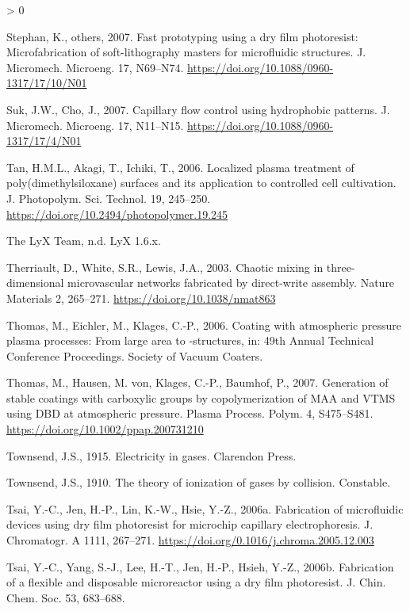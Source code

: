 \documentclass[
  11pt,
  twoside]{article}
\newlength{\cslhangindent}
\newenvironment{CSLReferences}[2] %
 {%
  \setlength{\parindent}{0pt}
  \ifodd #1 \everypar{\setlength{\hangindent}{\cslhangindent}}\ignorespaces\fi
  \ifnum #2 > 0
  \setlength{\parskip}{#2\baselineskip}
  \fi
 }%
 {}
\begin{document}
\begin{CSLReferences}{1}{0}
\leavevmode\hypertarget{ref-Step07}{}%
Stephan, K., others, 2007. Fast prototyping using a dry film photoresist: Microfabrication of soft-lithography masters for microfluidic structures. J. Micromech. Microeng. 17, N69--N74. \url{https://doi.org/10.1088/0960-1317/17/10/N01}

\leavevmode\hypertarget{ref-Suk07}{}%
Suk, J.W., Cho, J., 2007. Capillary flow control using hydrophobic patterns. J. Micromech. Microeng. 17, N11--N15. \url{https://doi.org/10.1088/0960-1317/17/4/N01}

\leavevmode\hypertarget{ref-Tan06}{}%
Tan, H.M.L., Akagi, T., Ichiki, T., 2006. Localized plasma treatment of poly(dimethylsiloxane) surfaces and its application to controlled cell cultivation. J. Photopolym. Sci. Technol. 19, 245--250. \url{https://doi.org/10.2494/photopolymer.19.245}

\leavevmode\hypertarget{ref-LyX}{}%
The LyX Team, n.d. LyX 1.6.x.

\leavevmode\hypertarget{ref-Ther03}{}%
Therriault, D., White, S.R., Lewis, J.A., 2003. Chaotic mixing in three-dimensional microvascular networks fabricated by direct-write assembly. Nature Materials 2, 265--271. \url{https://doi.org/10.1038/nmat863}

\leavevmode\hypertarget{ref-Thom06}{}%
Thomas, M., Eichler, M., Klages, C.-P., 2006. Coating with atmospheric pressure plasma processes: From large area to {}-structures, in: 49th Annual Technical Conference Proceedings. Society of Vacuum Coaters.

\leavevmode\hypertarget{ref-Thom07}{}%
Thomas, M., Hausen, M. von, Klages, C.-P., Baumhof, P., 2007. Generation of stable coatings with carboxylic groups by copolymerization of {MAA} and {VTMS} using {DBD} at atmospheric pressure. Plasma Process. Polym. 4, S475--S481. \url{https://doi.org/10.1002/ppap.200731210}

\leavevmode\hypertarget{ref-Town1915}{}%
Townsend, J.S., 1915. Electricity in gases. Clarendon Press.

\leavevmode\hypertarget{ref-Town1910}{}%
Townsend, J.S., 1910. The theory of ionization of gases by collision. Constable.

\leavevmode\hypertarget{ref-Tsai06-2}{}%
Tsai, Y.-C., Jen, H.-P., Lin, K.-W., Hsie, Y.-Z., 2006a. Fabrication of microfluidic devices using dry film photoresist for microchip capillary electrophoresis. J. Chromatogr. A 1111, 267--271. \url{https://doi.org/0.1016/j.chroma.2005.12.003}

\leavevmode\hypertarget{ref-Tsai06-1}{}%
Tsai, Y.-C., Yang, S.-J., Lee, H.-T., Jen, H.-P., Hsieh, Y.-Z., 2006b. Fabrication of a flexible and disposable microreactor using a dry film photoresist. J. Chin. Chem. Soc. 53, 683--688.


\end{CSLReferences}
\end{document}

